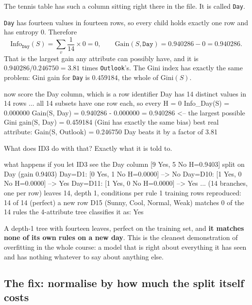 \documentclass[11pt]{article}
\begin{document}
The tennis table has such a column sitting right there in the file. It is
called \texttt{Day}.

\begin{worked}
\texttt{Day} has fourteen values in fourteen rows, so every child holds
exactly one row and has entropy $0$. Therefore
\[
  \mathrm{Info}_{\texttt{Day}}(S) = \sum_{v} \frac{1}{14}\times 0 = 0,
  \qquad
  \mathrm{Gain}(S, \texttt{Day}) = 0.940286 - 0 = \mathbf{0.940286} .
\]
That is the largest gain any attribute can possibly have, and it is
$0.940286 / 0.246750 = 3.81$ times \texttt{Outlook}'s. The Gini index has
exactly the same problem: Gini gain for \texttt{Day} is $0.459184$, the whole
of $\mathrm{Gini}(S)$.
\end{worked}

\begin{codeout}
now score the Day column, which is a row identifier
Day has 14 distinct values in 14 rows
   ... all 14 subsets have one row each, so every H = 0
Info_Day(S)  = 0.000000
Gain(S, Day) = 0.940286 - 0.000000 = 0.940286   <-- the largest possible
Gini gain(S, Day) = 0.459184   (Gini has exactly the same bias)
best real attribute:  Gain(S, Outlook) = 0.246750
Day beats it by a factor of 3.81
\end{codeout}

What does ID3 do with that? Exactly what it is told to.

\begin{codeout}
what happens if you let ID3 see the Day column
[9 Yes, 5 No  H=0.9403]  split on Day (gain 0.9403)
   Day=D1: [0 Yes, 1 No  H=0.0000] --> No
   Day=D10: [1 Yes, 0 No  H=0.0000] --> Yes
   Day=D11: [1 Yes, 0 No  H=0.0000] --> Yes
   ... (14 branches, one per row)
leaves 14, depth 1, conditions per rule 1
training rows reproduced: 14 of 14  (perfect)
a new row D15 (Sunny, Cool, Normal, Weak) matches 0 of the 14 rules
the 4-attribute tree classifies it as: Yes
\end{codeout}

\begin{keyidea}
A depth-1 tree with fourteen leaves, perfect on the training set, and
\textbf{it matches none of its own rules on a new day}. This is the cleanest
demonstration of overfitting in the whole course: a model that is right about
everything it has seen and has nothing whatever to say about anything else.
\end{keyidea}

\subsection{The fix: normalise by how much the split itself costs}
\end{document}
